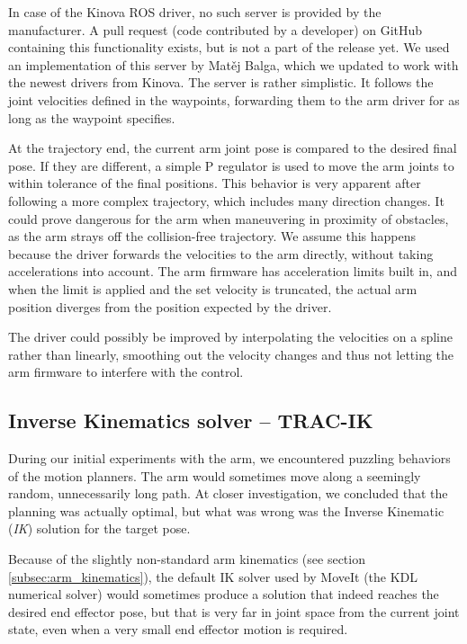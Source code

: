 \documentclass[buriama8_dp.tex]{subfiles}
\begin{document}
In case of the Kinova ROS driver, no such server is provided by the manufacturer. A pull request (code contributed by a developer) on GitHub containing this functionality exists, but is not a part of the release yet. We used an implementation of this server by Matěj Balga, which we updated to work with the newest drivers from Kinova. The server is rather simplistic. It follows the joint velocities defined in the waypoints, forwarding them to the arm driver for as long as the waypoint specifies.

At the trajectory end, the current arm joint pose is compared to the desired final pose. If they are different, a simple P regulator is used to move the arm joints to within tolerance of the final positions. This behavior is very apparent after following a more complex trajectory, which includes many direction changes. It could prove dangerous for the arm when maneuvering in proximity of obstacles, as the arm strays off the collision-free trajectory. We assume this happens because the driver forwards the velocities to the arm directly, without taking accelerations into account. The arm firmware has acceleration limits built in, and when the limit is applied and the set velocity is truncated, the actual arm position diverges from the position expected by the driver.

The driver could possibly be improved by interpolating the velocities on a spline rather than linearly, smoothing out the velocity changes and thus not letting the arm firmware to interfere with the control.

\subsection{Inverse Kinematics solver -- TRAC-IK}
\label{subsec:tracik}

During our initial experiments with the arm, we encountered puzzling behaviors of the motion planners. The arm would sometimes move along a seemingly random, unnecessarily long path. At closer investigation, we concluded that the planning was actually optimal, but what was wrong was the Inverse Kinematic (\emph{IK}) solution for the target pose.

Because of the slightly non-standard arm kinematics (see section \ref{subsec:arm_kinematics}), the default IK solver used by MoveIt (the KDL numerical solver) would sometimes produce a solution that indeed reaches the desired end effector pose, but that is very far in joint space from the current joint state, even when a very small end effector motion is required.
\end{document}

